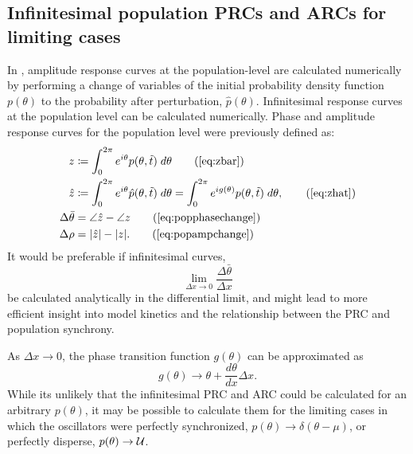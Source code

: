 \subsection{Infinitesimal population PRCs and ARCs for limiting cases}
In , amplitude response curves at the population-level are calculated numerically by performing a change of variables of the initial probability density function $p(\theta)$ to the probability after perturbation, $\hat{p}(\theta)$.
Infinitesimal response curves at the population level can be calculated numerically.
Phase and amplitude response curves for the population level were previously defined as:
\begin{align}
  z &\coloneqq \int_0^{2\pi} e^{i\theta} p(\theta, \tilde{t}) \; d\theta \tag{\ref{eq:zbar}}\\
  \hat{z} &\coloneqq  \int_0^{2\pi} e^{i\theta} \hat{p}(\theta, \tilde{t}) \; d\theta = \int_0^{2\pi} e^{i g(\theta)} p(\theta, \tilde{t}) \; d\theta,
  \tag{\ref{eq:zhat}}\\
  \Delta \bar{\theta} &= \angle \hat{z} - \angle z \tag{\ref{eq:popphasechange}}\\
  \Delta \rho &= |\hat{z}| - |z|.
  \tag{\ref{eq:popampchange}}
\end{align}
It would be preferable if infinitesimal curves, 
\[
  \lim_{\Delta x \to 0} \frac{\Delta \bar{\theta}}{\Delta x}
\]
be calculated analytically in the differential limit, and might lead to more efficient insight into model kinetics and the relationship between the PRC and population synchrony.

As $\Delta x \to 0$, the phase transition function $g(\theta)$ can be approximated as
\[
  g(\theta) \to \theta + \frac{d\theta}{dx}\Delta x.
\]
While its unlikely that the infinitesimal PRC and ARC could be calculated for an arbitrary $p(\theta)$, it may be possible to calculate them for the limiting cases in which the oscillators were perfectly synchronized, $p(\theta) \to \delta(\theta - \mu)$, or perfectly disperse, $p(\theta) \to {\cal U}$.

